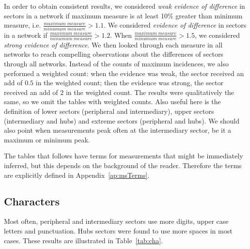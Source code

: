 In order to obtain consistent results, we considered \emph{weak evidence of difference} in sectors in a network
if maximum measure is at least 10\% greater than minimum measure,
i.e. $\frac{maximum\;measure}{minumum\;measure}>1.1$.
We considered \emph{evidence of difference} in sectors in a network if
$\frac{maximum\;measure}{minumum\;measure}>1.2$.
When 
$\frac{maximum\;measure}{minumum\;measure}>1.5$, we considered \emph{strong evidence of difference}.
We then looked through each measure in all networks to reach compelling observations about the
differences of sectors through all networks.
Instead of the counts of maximum incidences, we also performed a weighted count:
when the evidence was weak, the sector received an add of $0.5$ in the weighted count;
then the evidence was strong, the sector received an add of $2$ in the weighted count.
The results were qualitatively the same, so we omit the tables with weighted counts.
Also useful here is the definition of lower sectors (peripheral and intermediary),
upper sectors (intermediary and hubs) and extreme sectors (peripheral and hubs).
We should also point when measurements peak often at the intermediary sector,
be it a maximum or minimum peak.

The tables that follows have terms for measurements that might be immediately inferred,
but this depends on the background of the reader.
Therefore the terms are explicitly defined in Appendix~\ref{ap:msTerms}.

\subsection{Characters}\label{sec:cha}
Most often, peripheral and intermediary sectors use more digits, upper case letters and punctuation.
Hubs sectors were found to use more spaces in most cases. 
These results are illustrated in Table~\ref{tab:cha}.

\FloatBarrier

